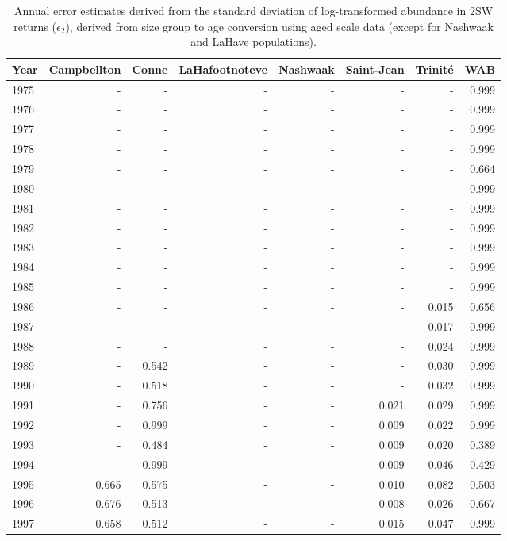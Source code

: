 \begingroup\footnotesize
\begin{longtable}{lrrrrrrr}
\caption{Annual error estimates derived from the standard deviation of log-transformed abundance 
                    in 2SW returns ($\epsilon_{2}$), derived from size group to age conversion using aged scale data 
                    (except for Nashwaak and LaHave populations).} \\ 
  \hline
Year & Campbellton & Conne & LaHafootnoteve & Nashwaak & Saint-Jean & Trinité & WAB \\ 
  \hline
1975 & - & - & - & - & - & - & 0.999 \\ 
  1976 & - & - & - & - & - & - & 0.999 \\ 
  1977 & - & - & - & - & - & - & 0.999 \\ 
  1978 & - & - & - & - & - & - & 0.999 \\ 
  1979 & - & - & - & - & - & - & 0.664 \\ 
  1980 & - & - & - & - & - & - & 0.999 \\ 
  1981 & - & - & - & - & - & - & 0.999 \\ 
  1982 & - & - & - & - & - & - & 0.999 \\ 
  1983 & - & - & - & - & - & - & 0.999 \\ 
  1984 & - & - & - & - & - & - & 0.999 \\ 
  1985 & - & - & - & - & - & - & 0.999 \\ 
  1986 & - & - & - & - & - & 0.015 & 0.656 \\ 
  1987 & - & - & - & - & - & 0.017 & 0.999 \\ 
  1988 & - & - & - & - & - & 0.024 & 0.999 \\ 
  1989 & - & 0.542 & - & - & - & 0.030 & 0.999 \\ 
  1990 & - & 0.518 & - & - & - & 0.032 & 0.999 \\ 
  1991 & - & 0.756 & - & - & 0.021 & 0.029 & 0.999 \\ 
  1992 & - & 0.999 & - & - & 0.009 & 0.022 & 0.999 \\ 
  1993 & - & 0.484 & - & - & 0.009 & 0.020 & 0.389 \\ 
  1994 & - & 0.999 & - & - & 0.009 & 0.046 & 0.429 \\ 
  1995 & 0.665 & 0.575 & - & - & 0.010 & 0.082 & 0.503 \\ 
  1996 & 0.676 & 0.513 & - & - & 0.008 & 0.026 & 0.667 \\ 
  1997 & 0.658 & 0.512 & - & - & 0.015 & 0.047 & 0.999 \\ 

\end{longtable}
